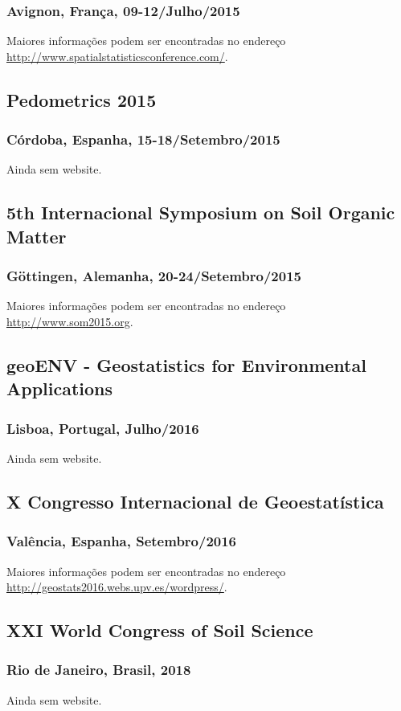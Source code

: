 \subsubsection{Avignon, França, 09-12/Julho/2015}
Maiores informações podem ser encontradas no endereço \url{http://www.spatialstatisticsconference.com/}.

\subsection{Pedometrics 2015}
\subsubsection{Córdoba, Espanha, 15-18/Setembro/2015}
Ainda sem website.

\subsection{5th Internacional Symposium on Soil Organic Matter}
\subsubsection{Göttingen, Alemanha, 20-24/Setembro/2015}
Maiores informações podem ser encontradas no endereço \url{http://www.som2015.org}.

\subsection{geoENV - Geostatistics for Environmental Applications}
\subsubsection{Lisboa, Portugal, Julho/2016}
Ainda sem website.

\subsection{X Congresso Internacional de Geoestatística}
\subsubsection{Valência, Espanha, Setembro/2016}
Maiores informações podem ser encontradas no endereço \url{http://geostats2016.webs.upv.es/wordpress/}.

\subsection{XXI World Congress of Soil Science}
\subsubsection{Rio de Janeiro, Brasil, 2018}
Ainda sem website.

